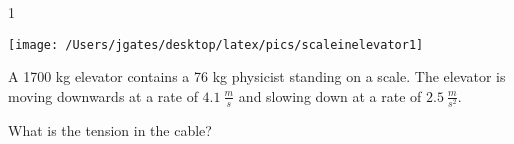 
\AddToShipoutPicture*{\BackgroundPic}

\addtocounter {ProbNum} {1}

\begin{floatingfigure}[r]{.2\textwidth}
\texttt{[image: /Users/jgates/desktop/latex/pics/scaleinelevator1]}
\end{floatingfigure}
 
{\bf \Large{}} A 1700 kg elevator contains a 76 kg physicist standing on a scale. The elevator is moving downwards at a rate of ${4.1~\tfrac{m}{s}}$ and slowing down at a rate of ${2.5~\tfrac{m}{s^2}}$.

\bigskip
What is the tension in the cable?




\vfill
\newpage
